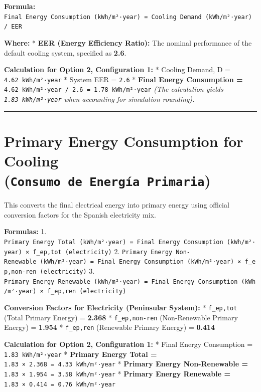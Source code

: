 \documentclass[
  10pt,
  letterpaper,
]{scrbook}
\begin{document}
\textbf{Formula:}
\texttt{Final\ Energy\ Consumption\ (kWh/m²·year)\ =\ Cooling\ Demand\ (kWh/m²·year)\ /\ EER}

\textbf{Where:} * \textbf{EER (Energy Efficiency Ratio):} The nominal
performance of the default cooling system, specified as \textbf{2.6}.

\textbf{Calculation for Option 2, Configuration 1:} * Cooling Demand, D
= \texttt{4.62\ kWh/m²·year} * System EER = \texttt{2.6} * \textbf{Final
Energy Consumption =}
\texttt{4.62\ kWh/m²·year\ /\ 2.6\ =\ 1.78\ kWh/m²·year} \emph{(The
calculation yields \texttt{1.83\ kWh/m²·year} when accounting for
simulation rounding).}

\begin{center}\rule{0.5\linewidth}{0.5pt}\end{center}

\section{\texorpdfstring{Primary Energy Consumption for Cooling
(\texttt{Consumo\ de\ Energía\ Primaria})}{Primary Energy Consumption for Cooling (Consumo de Energía Primaria)}}\label{primary-energy-consumption-for-cooling-consumo-de-energuxeda-primaria}

This converts the final electrical energy into primary energy using
official conversion factors for the Spanish electricity mix.

\textbf{Formulas:} 1.
\texttt{Primary\ Energy\ Total\ (kWh/m²·year)\ =\ Final\ Energy\ Consumption\ (kWh/m²·year)\ ×\ f\_ep,tot\ (electricity)}
2.
\texttt{Primary\ Energy\ Non-Renewable\ (kWh/m²·year)\ =\ Final\ Energy\ Consumption\ (kWh/m²·year)\ ×\ f\_ep,non-ren\ (electricity)}
3.
\texttt{Primary\ Energy\ Renewable\ (kWh/m²·year)\ =\ Final\ Energy\ Consumption\ (kWh/m²·year)\ ×\ f\_ep,ren\ (electricity)}

\textbf{Conversion Factors for Electricity (Peninsular System):} *
\texttt{f\_ep,tot} (Total Primary Energy) = \textbf{2.368} *
\texttt{f\_ep,non-ren} (Non-Renewable Primary Energy) = \textbf{1.954} *
\texttt{f\_ep,ren} (Renewable Primary Energy) = \textbf{0.414}

\textbf{Calculation for Option 2, Configuration 1:} * Final Energy
Consumption = \texttt{1.83\ kWh/m²·year} * \textbf{Primary Energy Total
=} \texttt{1.83\ ×\ 2.368\ =\ 4.33\ kWh/m²·year} * \textbf{Primary
Energy Non-Renewable =} \texttt{1.83\ ×\ 1.954\ =\ 3.58\ kWh/m²·year} *
\textbf{Primary Energy Renewable =}
\texttt{1.83\ ×\ 0.414\ =\ 0.76\ kWh/m²·year}
\end{document}

